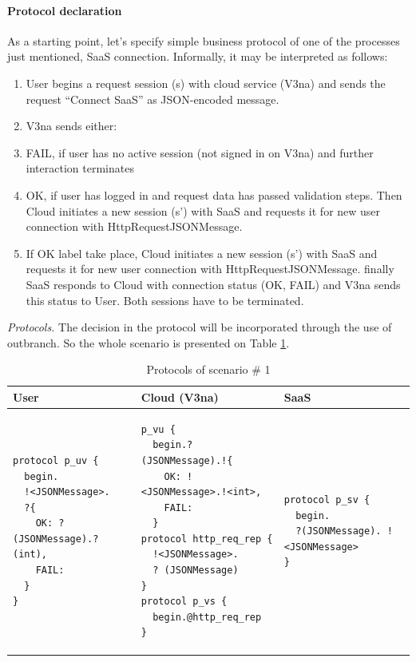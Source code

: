 \documentclass[a4paper]{easychair}
\begin{document}
\paragraph{Protocol declaration} As a starting point, let's specify simple business protocol of one of the processes just mentioned, SaaS connection. Informally, it may be interpreted as follows:
\begin{enumerate}
\item  User begins a request session (s) with cloud service (V3na) and sends the request ``Connect SaaS'' as JSON-encoded message.

\item  V3na sends either:

\item  FAIL, if user has no active session (not signed in on V3na) and further interaction terminates 

\item  OK, if user has logged in and request data has passed validation steps. Then Cloud initiates a new session (s') with SaaS and requests it for new user connection with HttpRequestJSONMessage.

\item  If OK label take place, Cloud initiates a new session (s') with SaaS and requests it for new user connection with HttpRequestJSONMessage. finally SaaS responds to Cloud with connection status (OK, FAIL) and V3na sends this status to User. Both sessions have to be terminated.
\end{enumerate}

\textit{Protocols.} The decision in the protocol will be incorporated through the use of outbranch. So the whole scenario is presented on Table \ref{tab:protocols-sc1}.

{
\lstset{
framerule=0pt,
numbers=none
}
\begin{longtable}{|p{}|p{}|p{}|}
\caption{Protocols of scenario \# 1}
\label{tab:protocols-sc1} \\ \hline
User & Cloud (V3na) & SaaS \\ \hline
\endhead

\begin{lstlisting}
protocol p_uv { 
  begin.
  !<JSONMessage>. 
  ?{
    OK: ?(JSONMessage).?(int),
    FAIL: 
  }
}
\end{lstlisting}
&
\begin{lstlisting}
p_vu { 
  begin.?(JSONMessage).!{
    OK: !<JSONMessage>.!<int>,
    FAIL: 
  }
protocol http_req_rep {
  !<JSONMessage>.
  ? (JSONMessage)
}
protocol p_vs { 
  begin.@http_req_rep 
}
\end{lstlisting}
&
\begin{lstlisting}
protocol p_sv { 
  begin.
  ?(JSONMessage). !<JSONMessage> 
}
\end{lstlisting}
\\ \hline
\end{longtable}
}
\end{document}

